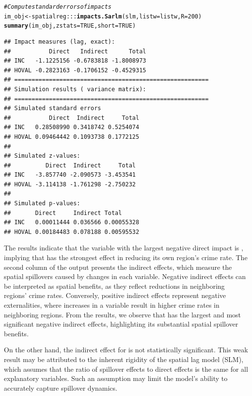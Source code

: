 \documentclass[english,12pt]{book}\usepackage[]{graphicx}\usepackage[]{xcolor}
\makeatletter
\newcommand{\hlnum}[1]{\textcolor[rgb]{0.686,0.059,0.569}{#1}}%
\newcommand{\hlcom}[1]{\textcolor[rgb]{0.678,0.584,0.686}{\textit{#1}}}%
\newcommand{\hlopt}[1]{\textcolor[rgb]{0,0,0}{#1}}%
\newcommand{\hldef}[1]{\textcolor[rgb]{0.345,0.345,0.345}{#1}}%
\newcommand{\hlkwb}[1]{\textcolor[rgb]{0.69,0.353,0.396}{#1}}%
\newcommand{\hlkwc}[1]{\textcolor[rgb]{0.333,0.667,0.333}{#1}}%
\newcommand{\hlkwd}[1]{\textcolor[rgb]{0.737,0.353,0.396}{\textbf{#1}}}%
\newenvironment{kframe}{%
 \def\at@end@of@kframe{}%
 \ifinner\ifhmode%
  \def\at@end@of@kframe{\end{minipage}}%
  \begin{minipage}{\columnwidth}%
 \fi\fi%
 \def\FrameCommand##1{\hskip\@totalleftmargin \hskip-\fboxsep
 \colorbox{shadecolor}{##1}\hskip-\fboxsep
     \hskip-\linewidth \hskip-\@totalleftmargin \hskip\columnwidth}%
 \MakeFramed {\advance\hsize-\width
   \@totalleftmargin\z@ \linewidth\hsize
   \@setminipage}}%
 {\par\unskip\endMakeFramed%
 \at@end@of@kframe}
\newenvironment{knitrout}{}{} %
\makeatother
\begin{document}
\begin{knitrout}
\color{fgcolor}\begin{kframe}
\begin{alltt}
\hlcom{# Compute standard errors of impacts}
\hldef{im_obj} \hlkwb{<-} \hldef{spatialreg}\hlopt{:::}\hlkwd{impacts.Sarlm}\hldef{(slm,} \hlkwc{listw} \hldef{= listw,} \hlkwc{R} \hldef{=} \hlnum{200}\hldef{)}
\hlkwd{summary}\hldef{(im_obj,} \hlkwc{zstats} \hldef{=} \hlnum{TRUE}\hldef{,} \hlkwc{short} \hldef{=} \hlnum{TRUE}\hldef{)}
\end{alltt}
\begin{verbatim}
## Impact measures (lag, exact):
##           Direct   Indirect      Total
## INC   -1.1225156 -0.6783818 -1.8008973
## HOVAL -0.2823163 -0.1706152 -0.4529315
## ========================================================
## Simulation results ( variance matrix):
## ========================================================
## Simulated standard errors
##           Direct  Indirect     Total
## INC   0.28508990 0.3418742 0.5254074
## HOVAL 0.09464442 0.1093738 0.1772125
## 
## Simulated z-values:
##          Direct  Indirect     Total
## INC   -3.857740 -2.090573 -3.453541
## HOVAL -3.114138 -1.761298 -2.750232
## 
## Simulated p-values:
##       Direct     Indirect Total     
## INC   0.00011444 0.036566 0.00055328
## HOVAL 0.00184483 0.078188 0.00595532
\end{verbatim}
\end{kframe}
\end{knitrout}

The results indicate that the variable with the largest negative direct impact is , implying that  has the strongest effect in reducing its own region’s crime rate. The second column of the output presents the indirect effects, which measure the spatial spillovers caused by changes in each variable. Negative indirect effects can be interpreted as spatial benefits, as they reflect reductions in neighboring regions’ crime rates. Conversely, positive indirect effects represent negative externalities, where increases in a variable result in higher crime rates in neighboring regions. From the results, we observe that  has the largest and most significant negative indirect effects, highlighting its substantial spatial spillover benefits. 

On the other hand, the indirect effect for  is not statistically significant. This weak result may be attributed to the inherent rigidity of the spatial lag model (SLM), which assumes that the ratio of spillover effects to direct effects is the same for all explanatory variables. Such an assumption may limit the model’s ability to accurately capture spillover dynamics.
\end{document}
